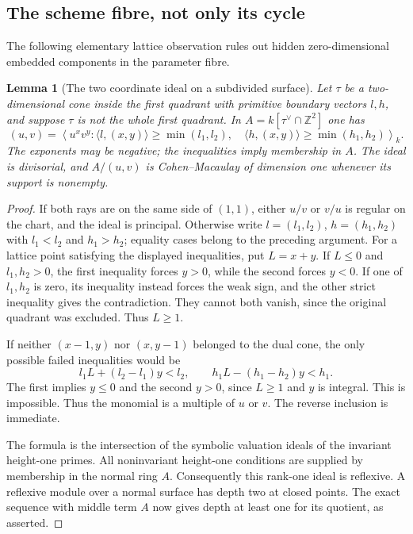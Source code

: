 \documentclass[11pt,reqno]{amsart}
\numberwithin{equation}{section}
\newtheorem{lemma}[theorem]{Lemma}
\theoremstyle{definition}\newtheorem{definition}[theorem]{Definition}
\theoremstyle{remark}\newtheorem{remark}[theorem]{Remark}
\begin{document}
\subsection{The scheme fibre, not only its cycle}
The following elementary lattice observation rules out hidden
zero-dimensional embedded components in the parameter fibre.

\begin{lemma}[The two coordinate ideal on a subdivided surface]
\label{lem:coordinate-ideal-v170}
Let $\tau$ be a two-dimensional cone inside the first quadrant with
primitive boundary vectors $l,h$, and suppose $\tau$ is not the
whole first quadrant. In $A=k[\tau^\vee\cap\mathbb Z^2]$ one has
\begin{equation}\label{eq:fibre-divisorial-v170}
 (u,v)=\left\langle u^xv^y:
 \langle l,(x,y)\rangle\geq\min(l_1,l_2),\quad
 \langle h,(x,y)\rangle\geq\min(h_1,h_2)\right\rangle_k.
\end{equation}
The exponents may be negative; the inequalities imply membership in
$A$. The ideal is divisorial, and $A/(u,v)$ is Cohen--Macaulay of
dimension one whenever its support is nonempty.
\end{lemma}
\begin{proof}
If both rays are on the same side of $(1,1)$, either $u/v$ or $v/u$
is regular on the chart, and the ideal is principal. Otherwise write
$l=(l_1,l_2)$, $h=(h_1,h_2)$ with
$l_1<l_2$ and $h_1>h_2$; equality cases belong to the preceding
argument. For a lattice point satisfying the displayed inequalities,
put $L=x+y$. If $L\leq0$ and $l_1,h_2>0$, the first inequality
forces $y>0$, while the second forces $y<0$. If one of $l_1,h_2$
is zero, its inequality instead forces the weak sign, and the other
strict inequality gives the contradiction. They cannot both vanish,
since the original quadrant was excluded. Thus $L\geq1$.

If neither $(x-1,y)$ nor $(x,y-1)$ belonged to the dual cone, the
only possible failed inequalities would be
\[
 l_1L+(l_2-l_1)y<l_2,
 \qquad h_1L-(h_1-h_2)y<h_1.
\]
The first implies $y\leq0$ and the second $y>0$, since $L\geq1$
and $y$ is integral. This is impossible. Thus the monomial is a
multiple of $u$ or $v$. The reverse inclusion is immediate.

The formula is the intersection of the symbolic valuation ideals
of the invariant height-one primes. All noninvariant height-one
conditions are supplied by membership in the normal ring $A$.
Consequently this rank-one ideal is reflexive. A reflexive module
over a normal surface has depth two at closed points. The exact
sequence with middle term $A$ now gives depth at least one for its
quotient, as asserted.
\end{proof}
\end{document}
